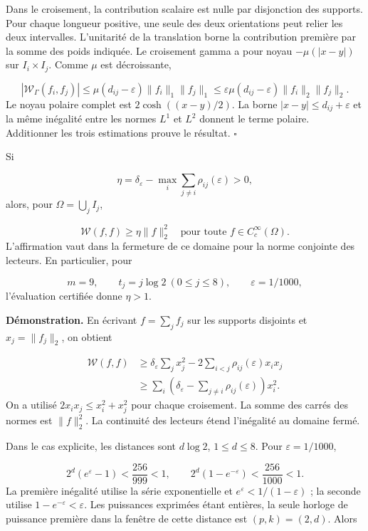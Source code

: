 Dans le croisement, la contribution scalaire est nulle par disjonction des supports. Pour chaque longueur positive, une seule des deux orientations peut relier les deux intervalles. L’unitarité de la translation borne la contribution première par la somme des poids indiquée. Le croisement gamma a pour noyau \(-\mu(|x-y|)\) sur \(I_i\times I_j\). Comme \(\mu\) est décroissante,

\[
|\mathscr W_\Gamma(f_i,f_j)|
\leq\mu(d_{ij}-\varepsilon)\|f_i\|_1\|f_j\|_1
\leq\varepsilon\mu(d_{ij}-\varepsilon)\|f_i\|_2\|f_j\|_2.
\]
Le noyau polaire complet est \(2\cosh((x-y)/2)\). La borne \(|x-y|\leq d_{ij}+\varepsilon\) et la même inégalité entre les normes \(L^1\) et \(L^2\) donnent le terme polaire. Additionner les trois estimations prouve le résultat. \hfill\(\square\)

Si

\[
\eta=\delta_\varepsilon-
\max_i\sum_{j\neq i}\rho_{ij}(\varepsilon)>0,
\]
alors, pour \(\Omega=\bigcup_j I_j\),

\[
\boxed{\mathscr W(f,f)\geq\eta\|f\|_2^2
\quad\text{pour toute }f\in C_c^\infty(\Omega).}
\]
L’affirmation vaut dans la fermeture de ce domaine pour la norme conjointe des lecteurs. En particulier, pour

\[
m=9,\qquad t_j=j\log2\ (0\leq j\leq8),\qquad
\varepsilon=1/1000,
\]
l’évaluation certifiée donne \(\eta>1\).

\textbf{Démonstration.} En écrivant \(f=\sum_jf_j\) sur les supports disjoints et \(x_j=\|f_j\|_2\), on obtient

\[
\begin{aligned}
\mathscr W(f,f)&\geq
\delta_\varepsilon\sum_jx_j^2
-2\sum_{i<j}\rho_{ij}(\varepsilon)x_ix_j\\
&\geq\sum_i\left(\delta_\varepsilon-
\sum_{j\neq i}\rho_{ij}(\varepsilon)\right)x_i^2.
\end{aligned}
\]
On a utilisé \(2x_ix_j\leq x_i^2+x_j^2\) pour chaque croisement. La somme des carrés des normes est \(\|f\|_2^2\). La continuité des lecteurs étend l’inégalité au domaine fermé.

Dans le cas explicite, les distances sont \(d\log2\), \(1\leq d\leq8\). Pour \(\varepsilon=1/1000\),

\[
2^d(e^\varepsilon-1)<\frac{256}{999}<1,
\qquad 2^d(1-e^{-\varepsilon})<\frac{256}{1000}<1.
\]
La première inégalité utilise la série exponentielle et \(e^\varepsilon<1/(1-\varepsilon)\) ; la seconde utilise \(1-e^{-\varepsilon}<\varepsilon\). Les puissances exprimées étant entières, la seule horloge de puissance première dans la fenêtre de cette distance est \((p,k)=(2,d)\). Alors

